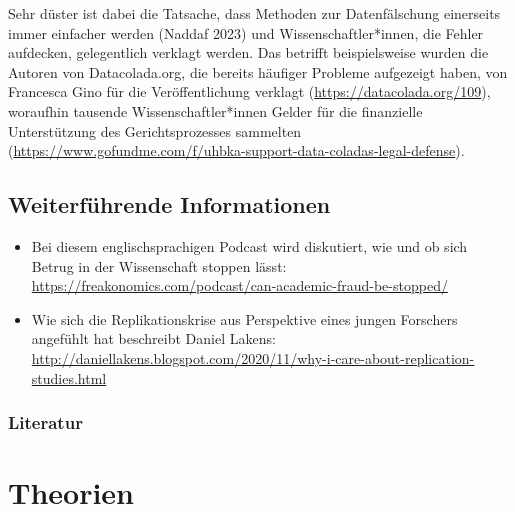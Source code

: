 \documentclass[
  letterpaper,
  DIV=11,
  numbers=noendperiod]{scrreprt}
\providecommand{\tightlist}{%
  \setlength{\itemsep}{0pt}\setlength{\parskip}{0pt}}\usepackage{longtable,booktabs,array}
\begin{document}
Sehr düster ist dabei die Tatsache, dass Methoden zur Datenfälschung
einerseits immer einfacher werden (Naddaf 2023) und
Wissenschaftler*innen, die Fehler aufdecken, gelegentlich verklagt
werden. Das betrifft beispielsweise wurden die Autoren von
Datacolada.org, die bereits häufiger Probleme aufgezeigt haben, von
Francesca Gino für die Veröffentlichung verklagt
(\url{https://datacolada.org/109}), woraufhin tausende
Wissenschaftler*innen Gelder für die finanzielle Unterstützung des
Gerichtsprozesses sammelten
(\url{https://www.gofundme.com/f/uhbka-support-data-coladas-legal-defense}).

\section{Weiterführende
Informationen}\label{weiterfuxfchrende-informationen}

\begin{itemize}
\tightlist
\item
  Bei diesem englischsprachigen Podcast wird diskutiert, wie und ob sich
  Betrug in der Wissenschaft stoppen lässt:
  \url{https://freakonomics.com/podcast/can-academic-fraud-be-stopped/}
\item
  Wie sich die Replikationskrise aus Perspektive eines jungen Forschers
  angefühlt hat beschreibt Daniel Lakens:
  \url{http://daniellakens.blogspot.com/2020/11/why-i-care-about-replication-studies.html}
\end{itemize}

\subsection{Literatur}\label{literatur-10}

\chapter{Theorien}\label{theorien}
\end{document}
